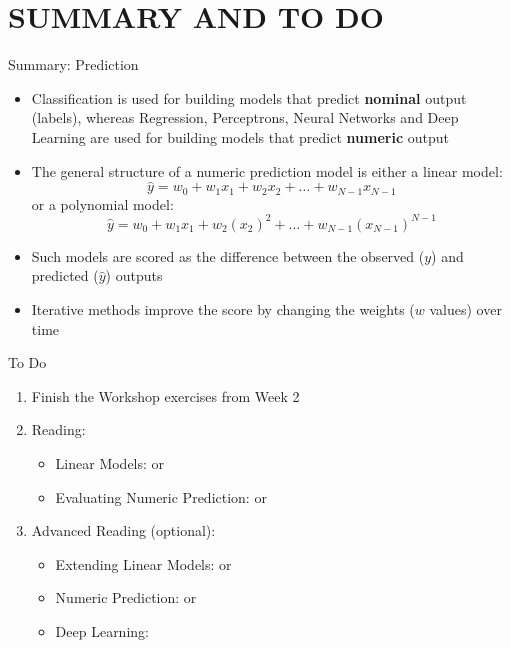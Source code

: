 \documentclass[handout]{beamer}
\newcommand{\strong}[1]{\textbf{\color{teal} #1}}
\begin{document}
\section*{SUMMARY AND TO DO}
\begin{frame}{Summary: Prediction}
\begin{itemize}
\item Classification is used for building models that predict \strong{nominal} output (labels), whereas Regression, Perceptrons, Neural Networks and Deep Learning are used for building models that predict \strong{numeric} output
\item The general structure of a numeric prediction model is either a linear model:
\[
	\hat{y} = w_0 + w_1 x_1 + w_2 x_2 + \ldots + w_{N-1} x_{N-1}
\]
or a polynomial model:
\[
	\hat{y} = w_0 + w_1 x_1 + w_2 (x_2)^2 + \ldots + w_{N-1} (x_{N-1})^{N-1}
\]
\item Such models are scored as the difference between the observed ($y$) and predicted ($\hat{y}$) outputs
\item Iterative methods improve the score by changing the weights ($w$ values) over time
\end{itemize}
\end{frame}
\begin{frame}{To Do}
\begin{enumerate}
\item Finish the Workshop exercises from Week 2
\item Reading:
    \begin{itemize}
    \item Linear Models: \cite[ch 4.6]{WFH3:2011} or \cite[ch 4.6]{WFH4:2016}
	\item Evaluating Numeric Prediction: \cite[ch 5.8]{WFH3:2011} or \cite[ch 5.9]{WFH4:2016}
	\end{itemize}
\item Advanced Reading (optional):
    \begin{itemize}
	\item Extending Linear Models: \cite[ch 6.3]{WFH3:2011} or \cite[ch 7.2]{WFH4:2016}
	\item Numeric Prediction: \cite[ch 6.5]{WFH3:2011} or \cite[ch 7.3]{WFH4:2016}
	\item Deep Learning: \cite[ch 10]{WFH4:2016}
    \end{itemize}
\end{enumerate}
\end{frame}
\end{document}
